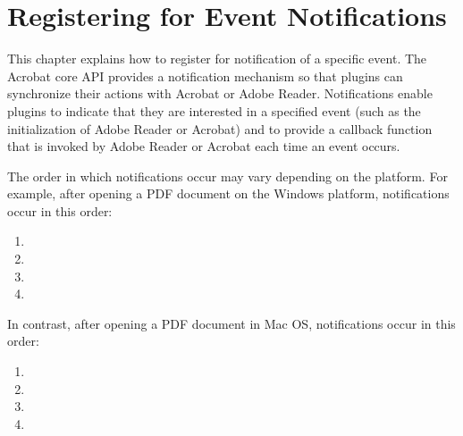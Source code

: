 \documentclass[letterpaper,12pt,english,openany,oneside]{sphinxmanual}
\begin{document}
\chapter{Registering for Event Notifications}
\label{\detokenize{Plugins_Notification:registering-for-event-notifications}}\label{\detokenize{Plugins_Notification::doc}}
This chapter explains how to register for notification of a specific event. The Acrobat core API provides a notification mechanism so that plugins can synchronize their actions with Acrobat or Adobe Reader. Notifications enable plugins to indicate that they are interested in a specified event (such as the initialization of Adobe Reader or Acrobat) and to provide a callback function that is invoked by Adobe Reader or Acrobat each time an event occurs.

The order in which notifications occur may vary depending on the platform. For example, after opening a PDF document on the Windows platform, notifications occur in this order:
\begin{enumerate}
%
\item {} 

\item {} 

\item {} 

\item {} 

\end{enumerate}

In contrast, after opening a PDF document in Mac OS, notifications occur in this order:
\begin{enumerate}
%
\item {} 

\item {} 

\item {} 

\item {} 

\end{enumerate}
\end{document}

